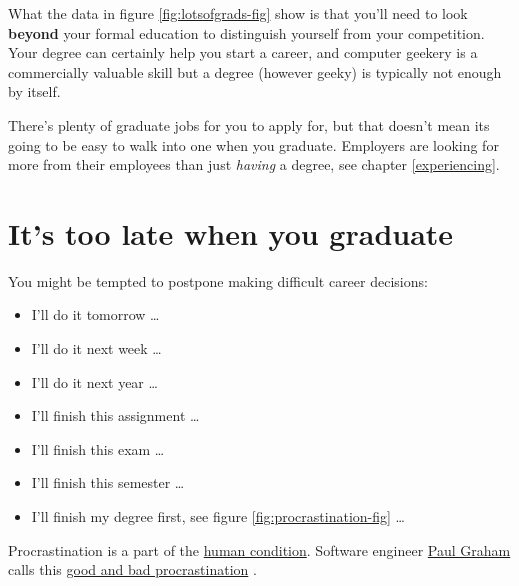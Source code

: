 \documentclass[
]{book}
\providecommand{\tightlist}{%
  \setlength{\itemsep}{0pt}\setlength{\parskip}{0pt}}
\begin{document}
What the data in figure \ref{fig:lotsofgrads-fig} show is that you'll need to look \textbf{beyond} your formal education to distinguish yourself from your competition. Your degree can certainly help you start a career, and computer geekery is a commercially valuable skill but a degree (however geeky) is typically not enough by itself.

There's plenty of graduate jobs for you to apply for, but that doesn't mean its going to be easy to walk into one when you graduate. Employers are looking for more from their employees than just \emph{having} a degree, see chapter \ref{experiencing}.

\hypertarget{thisstuffmatters}{%
\section{It's too late when you graduate}\label{thisstuffmatters}}

You might be tempted to postpone making difficult career decisions:

\begin{itemize}
\tightlist
\item
  I'll do it tomorrow \ldots{}
\item
  I'll do it next week \ldots{}
\item
  I'll do it next year \ldots{}
\item
  I'll finish this assignment \ldots{}
\item
  I'll finish this exam \ldots{}
\item
  I'll finish this semester \ldots{}
\item
  I'll finish my degree first, see figure \ref{fig:procrastination-fig} \ldots{}
\end{itemize}

Procrastination is a part of the \href{https://en.wikipedia.org/wiki/Human_condition}{human condition}. Software engineer \href{https://en.wikipedia.org/wiki/Paul_Graham_(programmer)}{Paul Graham} calls this \href{http://paulgraham.com/procrastination.html}{good and bad procrastination} \citep{procrastination}.
\end{document}
